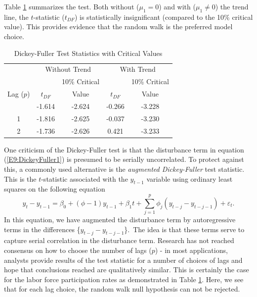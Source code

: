 Table \ref{T9:DFStats} summarizes the test. Both without ($\mu_1 =
0$) and with ($\mu_1 \neq 0$) the trend line, the $t$-statistic
($t_{DF}$) is statistically insignificant (compared to the 10\%
critical value). This provides evidence that the random walk is the
preferred model choice.

\begin{table}[h]
 \caption{\label{T9:DFStats} Dickey-Fuller Test
Statistics with Critical Values}
\begin{center}
\begin{tabular}{c|cccc}
\hline
& \multicolumn{2}{|c}{Without Trend} & \multicolumn{2}{c}{With Trend} \\
\cline{2-5}
&  & 10\% Critical  &  & 10\% Critical  \\
Lag ($p$)& $t_{DF}$ & Value & $t_{DF}$ & Value \\ \hline
& -1.614 & -2.624 & -0.266 & -3.228 \\
1 & -1.816 & -2.625 & -0.037 & -3.230 \\
2 & -1.736 & -2.626 &  0.421 & -3.233 \\ \hline
\end{tabular}\end{center}
 \end{table}

\linejed
\bigskip

One criticism of the Dickey-Fuller test is that the disturbance term
in equation (\ref{E9:DickeyFuller1}) is presumed to be serially
uncorrelated. To protect against this, a commonly used alternative
is the \emph{augmented Dickey-Fuller} test statistic. This is the
$t$-statistic associated with the $y_{t-1}$ variable using ordinary
least squares on the following equation
\begin{equation}\label{E9:DickeyFuller2}
y_t-y_{t-1}=\beta_0+\left( \phi -1\right) y_{t-1}+\beta
_1t+\sum_{j=1}^{p}\phi_{j}\left( y_{t-j}-y_{t-j-1}\right)
+\varepsilon_t.
\end{equation}
In this equation, we have augmented the disturbance term by
autoregressive terms in the differences \{$y_{t-j}-y_{t-j-1}$\}.\
The idea is that these terms serve to capture serial correlation in
the disturbance term. Research has not reached consensus on how to
choose the number of lags ($p$) - in most applications, analysts
provide results of the test statistic for a number of choices of
lags and hope that conclusions reached are qualitatively similar.
This is certainly the case for the labor force participation rates
as demonstrated in Table \ref{T9:DFStats}. Here, we see that for
each lag choice, the random walk null hypothesis can not be
rejected.

